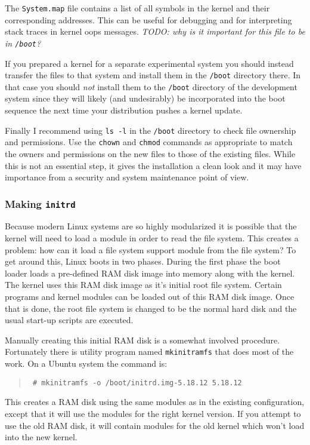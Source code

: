 \documentclass{article}
\newcommand{\command}[1]{\texttt{#1}}
\newcommand{\filename}[1]{\texttt{#1}}
\newcommand{\todo}[1]{\textit{TODO: #1}}
\newenvironment{commands}
  {\begin{quote} \tt}
  {\end{quote}}
\begin{document}
The \filename{System.map} file contains a list of all symbols in the kernel and their
corresponding addresses. This can be useful for debugging and for interpreting stack traces in
kernel oops messages. \todo{why is it important for this file to be in \filename{/boot}?}

If you prepared a kernel for a separate experimental system you should instead transfer the
files to that system and install them in the \filename{/boot} directory there. In that case you
should \emph{not} install them to the \filename{/boot} directory of the development system since
they will likely (and undesirably) be incorporated into the boot sequence the next time your
distribution pushes a kernel update.

Finally I recommend using \command{ls -l} in the \filename{/boot} directory to check file
ownership and permissions. Use the \command{chown} and \command{chmod} commands as appropriate
to match the owners and permissions on the new files to those of the existing files. While this
is not an essential step, it gives the installation a clean look and it may have importance from
a security and system maintenance point of view.


\subsubsection{Making \filename{initrd}}

Because modern Linux systems are so highly modularized it is possible that the kernel will need
to load a module in order to read the file system. This creates a problem: how can it load a
file system support module from the file system? To get around this, Linux boots in two phases.
During the first phase the boot loader loads a pre-defined RAM disk image into memory along with
the kernel. The kernel uses this RAM disk image as it's initial root file system. Certain
programs and kernel modules can be loaded out of this RAM disk image. Once that is done, the
root file system is changed to be the normal hard disk and the usual start-up scripts are
executed.

Manually creating this initial RAM disk is a somewhat involved procedure. Fortunately there is
utility program named \command{mkinitramfs} that does most of the work. On a Ubuntu system the
command is:
\begin{commands}
  \# mkinitramfs -o /boot/initrd.img-5.18.12 5.18.12
\end{commands}

This creates a RAM disk using the same modules as in the existing configuration, except that it
will use the modules for the right kernel version. If you attempt to use the old RAM disk, it
will contain modules for the old kernel which won't load into the new kernel.
\end{document}
